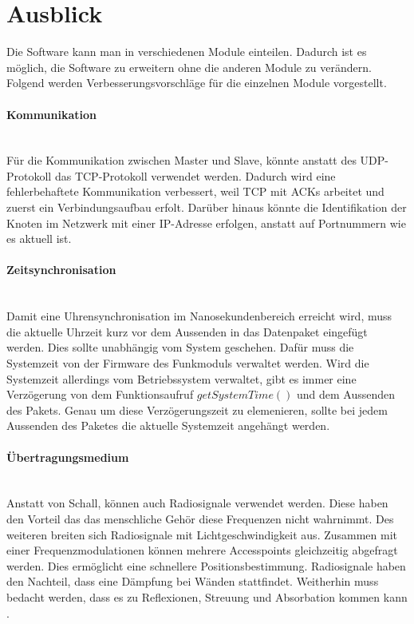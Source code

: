 \newpage

\section{Ausblick}
Die Software kann man in verschiedenen Module einteilen. Dadurch ist es möglich, die Software zu erweitern ohne die anderen Module zu verändern. Folgend werden Verbesserungsvorschläge für die einzelnen Module vorgestellt.

\paragraph{Kommunikation}\mbox{}\\
Für die Kommunikation zwischen Master und Slave, könnte anstatt des UDP-Protokoll das TCP-Protokoll verwendet werden. Dadurch wird eine fehlerbehaftete Kommunikation verbessert, weil TCP mit ACKs arbeitet und zuerst ein Verbindungsaufbau erfolt. Darüber hinaus könnte die Identifikation der Knoten im Netzwerk mit einer IP-Adresse erfolgen, anstatt auf Portnummern wie es aktuell ist.

\paragraph{Zeitsynchronisation}\mbox{}\\
Damit eine Uhrensynchronisation im Nanosekundenbereich erreicht wird, muss die aktuelle Uhrzeit kurz vor dem Aussenden in das Datenpaket eingefügt werden. Dies sollte unabhängig vom System geschehen. Dafür muss die Systemzeit von der Firmware des Funkmoduls verwaltet werden. Wird die Systemzeit allerdings vom Betriebssystem verwaltet, gibt es immer eine Verzögerung von dem Funktionsaufruf $getSystemTime()$ und dem Aussenden des Pakets. Genau um diese Verzögerungszeit zu elemenieren, sollte bei jedem Aussenden des Paketes die aktuelle Systemzeit angehängt werden.

\paragraph{Übertragungsmedium}\mbox{}\\
Anstatt von Schall, können auch Radiosignale verwendet werden. Diese haben den Vorteil das das menschliche Gehör diese Frequenzen nicht wahrnimmt. Des weiteren breiten sich Radiosignale mit Lichtgeschwindigkeit aus. Zusammen mit einer Frequenzmodulationen können mehrere Accesspoints gleichzeitig abgefragt werden. Dies ermöglicht eine schnellere Positionsbestimmung. Radiosignale haben den Nachteil, dass eine Dämpfung bei Wänden stattfindet. Weitherhin muss bedacht werden, dass es zu Reflexionen, Streuung und Absorbation kommen kann \cite{src_RADIOSIGNALE}.

